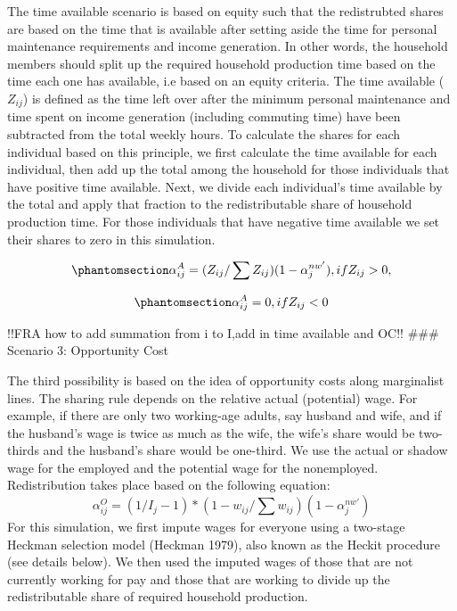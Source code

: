 \documentclass[
  11pt,
]{article}
\begin{document}
The time available scenario is based on equity such that the
redistrubted shares are based on the time that is available after
setting aside the time for personal maintenance requirements and income
generation. In other words, the household members should split up the
required household production time based on the time each one has
available, i.e based on an equity criteria. The time available
(\(Z_{ij}\)) is defined as the time left over after the minimum personal
maintenance and time spent on income generation (including commuting
time) have been subtracted from the total weekly hours. To calculate the
shares for each individual based on this principle, we first calculate
the time available for each individual, then add up the total among the
household for those individuals that have positive time available. Next,
we divide each individual's time available by the total and apply that
fraction to the redistributable share of household production time. For
those individuals that have negative time available we set their shares
to zero in this simulation.

\begin{equation}\phantomsection\label{eq-r2}{\alpha_{ij}^A= (Z_{ij}/ \sum Z_{ij}) (1-\alpha_{j}^{nw'}), if  Z_{ij}>0, 
}\end{equation}

\begin{equation}\phantomsection\label{eq-r3}{\alpha_{ij}^A =0, if Z_{ij}<0
}\end{equation}

!!FRA how to add summation from i to I,add in time available and OC!!
\#\#\# Scenario 3: Opportunity Cost

The third possibility is based on the idea of opportunity costs along
marginalist lines. The sharing rule depends on the relative actual
(potential) wage. For example, if there are only two working-age adults,
say husband and wife, and if the husband's wage is twice as much as the
wife, the wife's share would be two-thirds and the husband's share would
be one-third. We use the actual or shadow wage for the employed and the
potential wage for the nonemployed. Redistribution takes place based on
the following equation:
\[\alpha_{ij}^O= (1/{I_j-1})*(1-w_{ij}/\sum w_{ij} ) (1-\alpha_{j}^{nw'})
\] For this simulation, we first impute wages for everyone using a
two-stage Heckman selection model (Heckman 1979), also known as the
Heckit procedure (see details below). We then used the imputed wages of
those that are not currently working for pay and those that are working
to divide up the redistributable share of required household production.
\end{document}
